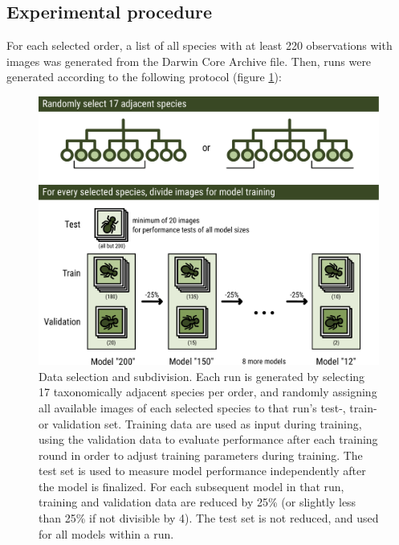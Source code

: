 \documentclass{article}
\begin{document}
\subsection*{Experimental procedure}
For each selected order, a list of all species with at least 220 observations with images was generated from the Darwin Core Archive file\autocite{GBIF_dataset}. Then, runs were generated according to the following protocol (figure \ref{fig:workflow}):


\begin{figure}[!ht]
  \includegraphics[width=\textwidth]{5}
  \caption{\footnotesize Data selection and subdivision. Each run is generated by selecting 17 taxonomically adjacent species per order, and randomly assigning all available images of each selected species to that run's test-, train- or validation set. Training data are used as input during training, using the validation data to evaluate performance after each training round in order to adjust training parameters during training. The test set is used to measure model performance independently after the model is finalized\autocite{Goodfellow-et-al-2016}. For each subsequent model in that run, training and validation data are reduced by 25\% (or slightly less than 25\% if not divisible by 4). The test set is not reduced, and used for all models within a run.}
  \label{fig:workflow}
\end{figure}
\end{document}
